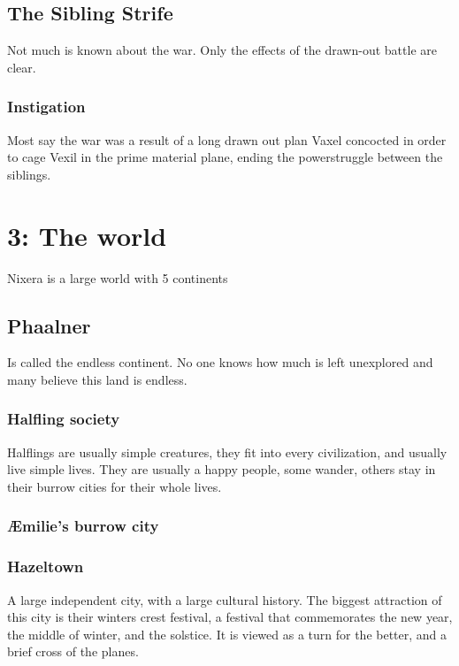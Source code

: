 \documentclass[a4paper]{article}
\begin{document}
\subsection{The Sibling Strife}
Not much is known about the war. Only the effects of the drawn-out battle are clear. 
 
\subsubsection{Instigation}
Most say the war was a result of a long drawn out plan Vaxel concocted in order to cage Vexil in the prime material plane, ending the powerstruggle between the siblings.

\section{3: The world}
Nixera is a large world with 5 continents
\subsection{Phaalner}
Is called the endless continent. No one knows how much is left unexplored and many believe this land is endless.

\subsubsection{Halfling society}
Halflings are usually simple creatures, they fit into every civilization, and usually live simple lives. They are usually a happy people, some wander, others stay in their burrow cities for their whole lives. 

\subsubsection{Æmilie's burrow city}

\subsubsection{Hazeltown}
A large independent city, with a large cultural history. The biggest attraction of this city is their winters crest festival, a festival that commemorates the new year, the middle of winter, and the solstice. It is viewed as a turn for the better, and a brief cross of the planes.
\end{document}
